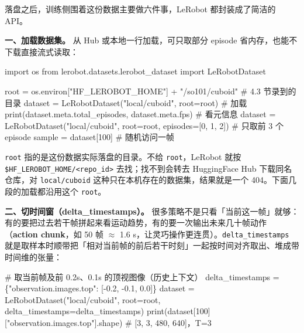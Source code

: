 \documentclass[
  chinese,
]{ctexart}
\newenvironment{Shaded}{\begin{snugshade}}{\end{snugshade}}
\newcommand{\BuiltInTok}[1]{\textcolor[rgb]{0.00,0.23,0.31}{#1}}
\newcommand{\CommentTok}[1]{\textcolor[rgb]{0.37,0.37,0.37}{#1}}
\newcommand{\DecValTok}[1]{\textcolor[rgb]{0.68,0.00,0.00}{#1}}
\newcommand{\FloatTok}[1]{\textcolor[rgb]{0.68,0.00,0.00}{#1}}
\newcommand{\ImportTok}[1]{\textcolor[rgb]{0.00,0.46,0.62}{#1}}
\newcommand{\NormalTok}[1]{\textcolor[rgb]{0.00,0.23,0.31}{#1}}
\newcommand{\OperatorTok}[1]{\textcolor[rgb]{0.37,0.37,0.37}{#1}}
\newcommand{\StringTok}[1]{\textcolor[rgb]{0.13,0.47,0.30}{#1}}
\begin{document}
落盘之后，训练侧围着这份数据主要做六件事，LeRobot 都封装成了简洁的 API。

\textbf{一、加载数据集。} 从 Hub 或本地一行加载，可只取部分 episode
省内存，也能不下载直接流式读取：

\begin{Shaded}
\begin{Highlighting}[]
\ImportTok{import}\NormalTok{ os}
\ImportTok{from}\NormalTok{ lerobot.datasets.lerobot\_dataset }\ImportTok{import}\NormalTok{ LeRobotDataset}

\NormalTok{root }\OperatorTok{=}\NormalTok{ os.environ[}\StringTok{"HF\_LEROBOT\_HOME"}\NormalTok{] }\OperatorTok{+} \StringTok{"/so101/cuboid"}   \CommentTok{\# 4.3 节录到的目录}
\NormalTok{dataset }\OperatorTok{=}\NormalTok{ LeRobotDataset(}\StringTok{"local/cuboid"}\NormalTok{, root}\OperatorTok{=}\NormalTok{root)  }\CommentTok{\# 加载}
\BuiltInTok{print}\NormalTok{(dataset.meta.total\_episodes, dataset.meta.fps)  }\CommentTok{\# 看元信息}
\NormalTok{dataset }\OperatorTok{=}\NormalTok{ LeRobotDataset(}\StringTok{"local/cuboid"}\NormalTok{, root}\OperatorTok{=}\NormalTok{root, episodes}\OperatorTok{=}\NormalTok{[}\DecValTok{0}\NormalTok{, }\DecValTok{1}\NormalTok{, }\DecValTok{2}\NormalTok{])  }\CommentTok{\# 只取前 3 个 episode}
\NormalTok{sample }\OperatorTok{=}\NormalTok{ dataset[}\DecValTok{100}\NormalTok{]                               }\CommentTok{\# 随机访问一帧}
\end{Highlighting}
\end{Shaded}

\texttt{root} 指的是这份数据实际落盘的目录。不给 \texttt{root}，LeRobot
就按 \texttt{\$HF\_LEROBOT\_HOME/\textless{}repo\_id\textgreater{}}
去找；找不到会转去 HuggingFace Hub 下载同名仓库，对
\texttt{local/cuboid} 这种只在本机存在的数据集，结果就是一个
404。下面几段的加载都沿用这个 \texttt{root}。

\textbf{二、切时间窗（delta\_timestamps）。}
很多策略不是只看「当前这一帧」就够：有的要把过去若干帧拼起来看运动趋势，有的要一次输出未来几十帧动作（\textbf{action
chunk}，如 50 帧 \(\approx\) 1.6
s，让灵巧操作更连贯）。\texttt{delta\_timestamps}
就是取样本时顺带把「相对当前帧的前后若干时刻」一起按时间对齐取出、堆成带时间维的张量：

\begin{Shaded}
\begin{Highlighting}[]
\CommentTok{\# 取当前帧及前 0.2s、0.1s 的顶视图像（历史上下文）}
\NormalTok{delta\_timestamps }\OperatorTok{=}\NormalTok{ \{}\StringTok{"observation.images.top"}\NormalTok{: [}\OperatorTok{{-}}\FloatTok{0.2}\NormalTok{, }\OperatorTok{{-}}\FloatTok{0.1}\NormalTok{, }\FloatTok{0.0}\NormalTok{]\}}
\NormalTok{dataset }\OperatorTok{=}\NormalTok{ LeRobotDataset(}\StringTok{"local/cuboid"}\NormalTok{, root}\OperatorTok{=}\NormalTok{root, delta\_timestamps}\OperatorTok{=}\NormalTok{delta\_timestamps)}
\BuiltInTok{print}\NormalTok{(dataset[}\DecValTok{100}\NormalTok{][}\StringTok{"observation.images.top"}\NormalTok{].shape)  }\CommentTok{\# [3, 3, 480, 640]，T=3}
\end{Highlighting}
\end{Shaded}
\end{document}
